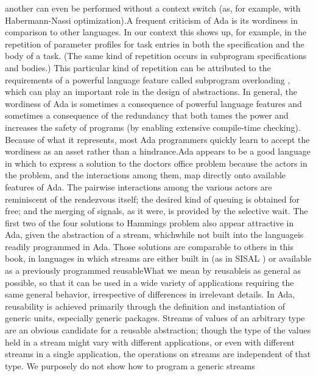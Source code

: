 another can even be performed without a context switch (as, for example,
with Habermann-Nassi optimization).\Endpara[]
\Para[]A frequent criticism of Ada is its wordiness in comparison
to other languages. In our context this shows up, for example, in
the repetition of parameter profiles for task entries in both the
specification and the body of a task. (The same kind of repetition
occurs in subprogram specifications and bodies.) This particular kind
of repetition can be attributed to the requirements of a powerful
language feature called \txtxemph[]subprogram overloading%
\txtxendemph[], which can play an important role in the design of
abstractions. In general, the wordiness of Ada is sometimes a consequence
of powerful language features and sometimes a consequence of the redundancy
that both tames the power and increases the safety of programs (by
enabling extensive compile-time checking). Because of what it represents,
most Ada programmers quickly learn to accept the wordiness as an asset
rather than a hindrance.\Endpara[]
\Para[]Ada appears to be a good language in which to express a solution
to the doctor\rsquo[]s office problem because the actors in the problem,
and the interactions among them, map directly onto available features
of Ada. The pairwise interactions among the various actors are reminiscent
of the rendezvous itself; the desired kind of queuing is obtained
for free; and the merging of signals, as it were, is provided by the
selective wait. The first two of the four solutions to Hamming\rsquo[]s
problem also appear attractive in Ada, given the abstraction of a
stream, which\EmDash[]while not built into the language\EmDash[]is
readily programmed in Ada. Those solutions are comparable to others
in this book, in languages in which streams are either built in (as
in SISAL \Endcit[]) or available as a
previously programmed reusable\NtFoot[]\NtNtpar[]What we mean by %
\txtxemph[]reusable\txtxendemph[] is \txtxemph[]as general as possible,
so that it can be used in a wide variety of applications requiring
the same general behavior, irrespective of differences in irrelevant
details\txtxendemph[]. In Ada, reusability is achieved primarily through
the definition and instantiation of generic units, especially generic
packages. Streams of values of an arbitrary type are an obvious candidate
for a reusable abstraction; though the type of the values held in
a stream might vary with different applications, or even with different
streams in a single application, the operations on streams are independent
of that type. We purposely do not show how to program a generic \ldquo[]streams\rdquo[]
